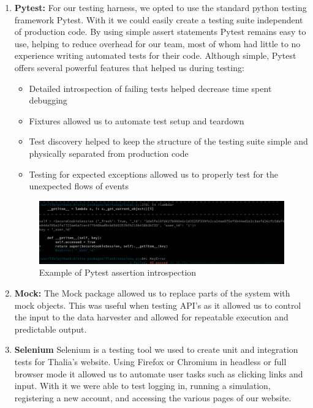 \documentclass[main.tex]{subfiles}
\begin{document}
\begin{enumerate}
\item \textbf{Pytest\cite{pytest}:}
For our testing harness, we opted to use the standard python testing framework Pytest. With it we could easily create a testing suite independent of production code. By using simple assert statements Pytest remains easy to use, helping to reduce overhead for our team, most of whom had little to no experience writing automated tests for their code. Although simple, Pytest offers several powerful features that helped us during testing:
\begin{itemize}
\item Detailed introspection of failing tests helped decrease time spent debugging
\item Fixtures allowed us to automate test setup and teardown
\item Test discovery helped to keep the structure of the testing suite simple and physically separated from production code
\item Testing for expected exceptions allowed us to  properly test for the unexpected flows of events
\end{itemize}


\begin{figure}[H]
   \centering
   \includegraphics[scale=0.3]{06Testing/06Pictures/failedTest.png}
   \caption{Example of Pytest assertion introspection}
   \label{Pytest example}
\end{figure}

\item \textbf{Mock\cite{mock}:}
The Mock package allowed us to replace parts of the system with mock objects. This was useful when testing API’s as it allowed us to control the input to the data harvester and allowed for repeatable execution and predictable output.

\item \textbf{Selenium\cite{selenium}}
Selenium is a testing tool we used to create unit and integration tests for Thalia’s website. Using Firefox or Chromium in headless or full browser mode it allowed us to automate user tasks such as clicking links and input. With it we were able to test logging in, running a simulation, registering a new account, and accessing the various pages of our website.


\end{enumerate}
\end{document}
